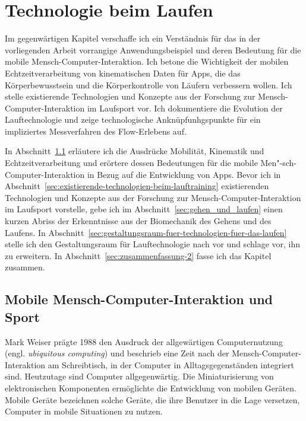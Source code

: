 \chapter{Technologie beim Laufen}
\label{cha:technologie_beim_laufen}

Im gegenwärtigen Kapitel verschaffe ich ein Verständnis für das in der vorliegenden Arbeit vorrangige Anwendungsbeispiel und deren Bedeutung für die mobile Mensch-Computer-Interaktion. Ich betone die Wichtigkeit der mobilen Echtzeitverarbeitung von kinematischen Daten für Apps, die das Körperbewusstsein und die Körperkontrolle von Läufern verbessern wollen. Ich stelle existierende Technologien und Konzepte aus der Forschung zur Mensch-Computer-Interaktion im Laufsport vor. Ich dokumentiere die Evolution der Lauftechnologie und zeige technologische Anknüpfunhgspunkte für ein impliziertes Messverfahren des Flow-Erlebens auf.

In Abschnitt~\ref{sec:mensch_computer_interaktion_und_sport} erläutere ich die Ausdrücke Mobilität, Kinematik und Echtzeitverarbeitung und erörtere dessen Bedeutungen für die mobile Men"-sch-Computer-Interaktion in Bezug auf die Entwicklung von Apps. Bevor ich in Abschnitt~\ref{sec:existierende-technologien-beim-lauftraining} existierenden Technologien und Konzepte aus der Forschung zur Mensch-Computer-Interaktion im Laufsport vorstelle, gebe ich im Abschnitt~\ref{sec:gehen_und_laufen} einen kurzen Abriss der Erkenntnisse aus der Biomechanik des Gehens und des Laufens. In Abschnitt~\ref{sec:gestaltungsraum-fuer-technologien-fuer-das-laufen} stelle ich den Gestaltungsraum für Lauftechnologie nach \citet{Jensen2014} vor und schlage vor, ihn zu erweitern. In Abschnitt~\ref{sec:zusammenfassung-2} fasse ich das Kapitel zusammen.

\section{Mobile Mensch-Computer-Interaktion und Sport}
\label{sec:mensch_computer_interaktion_und_sport}

Mark Weiser prägte 1988 den Ausdruck der allgewärtigen Computernutzung (engl. \emph{ubiquitous computing}) und beschrieb eine Zeit nach der Mensch-Computer-Interaktion am Schreibtisch, in der Computer in Alltagsgegenständen integriert sind. Heutzutage sind Computer allgegenwärtig. Die Miniaturisierung von elektronischen Komponenten ermöglichte die Entwicklung von mobilen Geräten. Mobile Geräte bezeichnen solche Geräte, die ihre Benutzer in die Lage versetzen, Computer in mobile Situationen zu nutzen.

